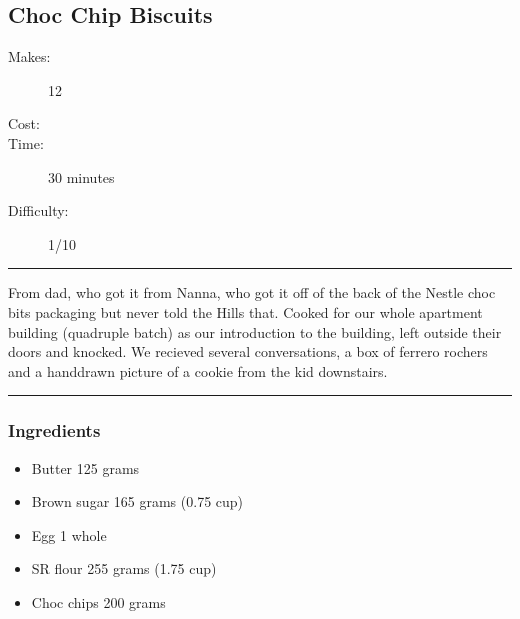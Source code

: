 \documentclass[]{article}
\begin{document}
\subsection*{\center\huge Choc Chip Biscuits}
\begin{description}
\item[Makes:] 12 
\item[Cost:] \textdollar
\item[Time:] 30 minutes
\item[Difficulty:] 1/10
\end{description}
\vspace{0.2cm}\hrule\vspace{0.5cm}
\begin{adjustwidth}{0.5 cm}{0.5 cm}

From dad, who got it from Nanna, who got it off of the back of the Nestle choc bits packaging but never told the Hills that. Cooked for our whole apartment building (quadruple batch) as our introduction to the building, left outside their doors and knocked. We recieved several conversations, a box of ferrero rochers and a handdrawn picture of a cookie from the kid downstairs. \hfill{}\color{black}

\end{adjustwidth}
\vspace{0.5cm}\hrule
\subsubsection*{\Large Ingredients}
\begin{multicols}{2}
\begin{itemize}
 \item Butter \hfill 125 grams
 \item Brown sugar \hfill 165 grams (0.75 cup)
 \item Egg \hfill 1 whole
 \item SR flour \hfill 255 grams (1.75 cup)
 \item Choc chips \hfill 200 grams
\end{itemize}
\end{multicols}
\end{document}
